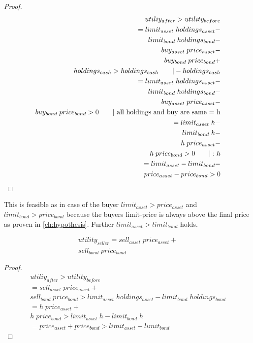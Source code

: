 \documentclass[Bachelorarbeit.tex]{subfiles}
\begin{document}
\begin{proof}
\begin{align*}
	utiliy_{after} > utility_{before}
		\\ = limit_{asset} \; holdings_{asset} - \\
				limit_{bond} \; holdings_{bond} - \\
				buy_{asset} \; price_{asset} - \\
				buy_{bond} \; price_{bond} + \\
				holdings_{cash} > holdings_{cash}	\tag*{$| -holdings_{cash}$}
		\\ = limit_{asset} \; holdings_{asset} - \\
				limit_{bond} \; holdings_{bond} - \\
				buy_{asset} \; price_{asset} - \\
				buy_{bond} \; price_{bond} > 0		\tag*{$|$ all holdings and buy are same = h}
		\\ = limit_{asset} \; h - \\
				limit_{bond} \; h - \\
				h \; price_{asset} - \\
				h \; price_{bond} > 0				\tag*{$|:h$}
		\\ = limit_{asset} - limit_{bond} - \\
				price_{asset} - price_{bond} > 0
\end{align*}
\end{proof}

This is feasible as in case of the buyer $limit_{asset} > price_{asset}$ and $limit_{bond} > price_{bond}$ because the buyers limit-price is always above the final price as proven in \ref{ch:hypothesis}. Further $limit_{asset} > limit_{bond}$ holds.

\begin{align*}
	utility_{seller} = sell_{asset} \; price_{asset} + \\
				sell_{bond} \; price_{bond}
\end{align*}

\begin{proof}
\begin{align*}
	utiliy_{after} > utility_{before}
		\\ = sell_{asset} \; price_{asset} + \\
				sell_{bond} \; price_{bond} >
				limit_{asset} \; holdings_{asset} -
				limit_{bond} \; holdings_{bond}		\tag*{$|$ all holdings and sell are same = h}
		\\ = h \; price_{asset} + \\
				h \; price_{bond} >
				limit_{asset} \; h -
				limit_{bond} \; h					\tag*{$|:h$}
		\\ =  price_{asset} + price_{bond} >
				limit_{asset} - limit_{bond} 
\end{align*}
\end{proof}
\end{document}
